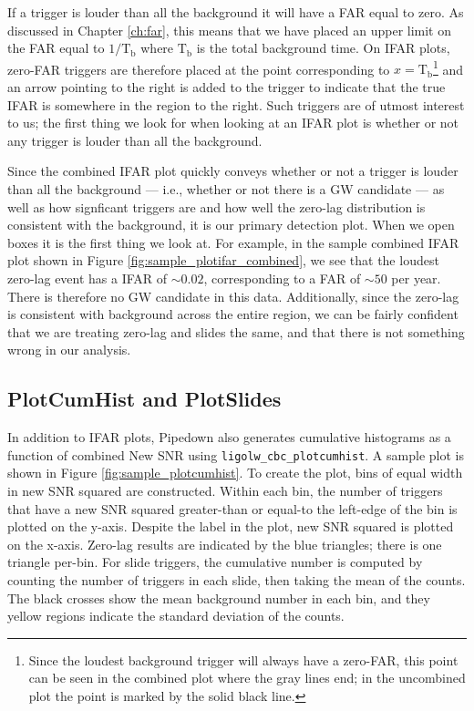 If a trigger is louder than all the background it will have a \ac{FAR} equal to zero. As discussed in Chapter \ref{ch:far}, this means that we have placed an upper limit on the \ac{FAR} equal to $1/\mathrm{T_b}$ where $\mathrm{T_b}$ is the total background time. On IFAR plots, zero-\ac{FAR} triggers are therefore placed at the point corresponding to $x=\mathrm{T_b}$\footnote{Since the loudest background trigger will always have a zero-FAR, this point can be seen in the combined plot where the gray lines end; in the uncombined plot the point is marked by the solid black line.} and an arrow pointing to the right is added to the trigger to indicate that the true IFAR is somewhere in the region to the right. Such triggers are of utmost interest to us; the first thing we look for when looking at an IFAR plot is whether or not any trigger is louder than all the background.

Since the combined IFAR plot quickly conveys whether or not a trigger is louder than all the background --- i.e., whether or not there is a \ac{GW} candidate --- as well as how signficant triggers are and how well the zero-lag distribution is consistent with the background, it is our primary detection plot. When we open boxes it is the first thing we look at. For example, in the sample combined IFAR plot shown in Figure \ref{fig:sample_plotifar_combined}, we see that the loudest zero-lag event has a IFAR of $\sim0.02$, corresponding to a \ac{FAR} of $\sim50$ per year. There is therefore no \ac{GW} candidate in this data. Additionally, since the zero-lag is consistent with background across the entire region, we can be fairly confident that we are treating zero-lag and slides the same, and that there is not something wrong in our analysis.

\subsection{PlotCumHist and PlotSlides}

In addition to IFAR plots, Pipedown also generates cumulative histograms as a function of combined New \ac{SNR} using \verb|ligolw_cbc_plotcumhist|. A sample plot is shown in Figure \ref{fig:sample_plotcumhist}. To create the plot, bins of equal width in new \ac{SNR} squared are constructed. Within each bin, the number of triggers that have a new \ac{SNR} squared greater-than or equal-to the left-edge of the bin is plotted on the y-axis. Despite the label in the plot, new \ac{SNR} squared is plotted on the x-axis. Zero-lag results are indicated by the blue triangles; there is one triangle per-bin. For slide triggers, the cumulative number is computed by counting the number of triggers in each slide, then taking the mean of the counts. The black crosses show the mean background number in each bin, and they yellow regions indicate the standard deviation of the counts. 

